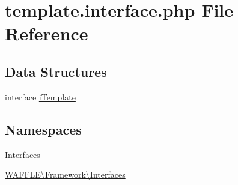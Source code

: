 \hypertarget{template_8interface_8php}{}\section{template.\+interface.\+php File Reference}
\label{template_8interface_8php}
\subsection*{Data Structures}
\begin{DoxyCompactItemize}
\item 
interface \hyperlink{interface_w_a_f_f_l_e_1_1_framework_1_1_interfaces_1_1i_template}{i\+Template}
\end{DoxyCompactItemize}
\subsection*{Namespaces}
\begin{DoxyCompactItemize}
\item 
 \hyperlink{namespace_interfaces}{Interfaces}
\item 
 \hyperlink{namespace_w_a_f_f_l_e_1_1_framework_1_1_interfaces}{W\+A\+F\+F\+L\+E\textbackslash{}\+Framework\textbackslash{}\+Interfaces}
\end{DoxyCompactItemize}

